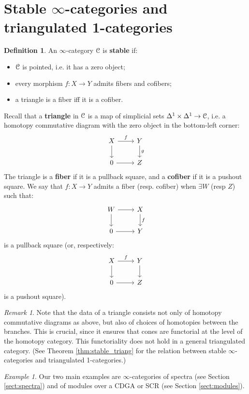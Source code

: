 \documentclass[10pt,a4paper,reqno,oneside]{book} %
\theoremstyle{plain}
\theoremstyle{definition}
\newtheorem{defin}[thm]{Definition}
\theoremstyle{remark}
\newtheorem{eg}[thm]{Example}
\newtheorem{rem}[thm]{Remark}
\numberwithin{equation}{section}
\begin{document}
\section{Stable $\infty$-categories and triangulated 1-categories}

\begin{defin}
An $\infty$-category $\mathcal C$ is \textbf{stable} if:
\begin{itemize}
\item $\mathcal C$ is pointed, i.e. it has a zero object;
\item every morphism $f : X \to Y$ admits fibers and cofibers;
\item a triangle is a fiber iff it is a cofiber.
\end{itemize}
\end{defin}

Recall that a \textbf{triangle} in $\mathcal C$ is a map of simplicial sets $\Delta^1 \times \Delta^1 \to \mathcal C$,
i.e. a homotopy commutative diagram with the zero object in the bottom-left corner:
\[
\begin{tikzcd}
X\arrow{r}{f}\arrow{d} & Y\arrow{d}{g} \\
0\arrow{r} & Z
\end{tikzcd}
\]
The triangle is a \textbf{fiber} if it is a pullback square, and a \textbf{cofiber} if it is a pushout square. We say
that $f: X \to Y$ admits a fiber (resp. cofiber) when $\exists W$ (resp $Z$) such that:
\[
\begin{tikzcd}
W\arrow{r}\arrow{d} & X\arrow{d}{f} \\
0\arrow{r} & Y
\end{tikzcd}
\]
is a pullback square (or, respectively:
\[
\begin{tikzcd}
X\arrow{r}{f}\arrow{d} & Y\arrow{d} \\
0\arrow{r} & Z
\end{tikzcd}
\]
is a pushout square).

\begin{rem}
Note that the data of a triangle consists not only of homotopy commutative diagrams as above, but also of choices of 
homotopies between the branches. This is crucial, since it ensures that cones are
functorial at the level of the homotopy category. This functoriality does not hold in a general triangulated category. 
(See Theorem \ref{thm:stable_triang} for the relation between stable
$\infty$-categories and triangulated 1-categories.)
\end{rem}

\begin{eg}
Our two main examples are $\infty$-categories of spectra (see Section \ref{sect:spectra}) and of modules over a CDGA or SCR
(see Section \ref{sect:modules}).
\end{eg}
\end{document}
